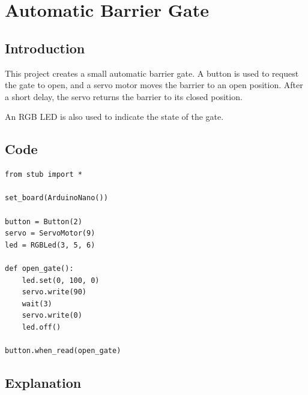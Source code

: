 \newpage

\section{Automatic Barrier Gate}

\subsection{Introduction}

This project creates a small automatic barrier gate. A button is used to
request the gate to open, and a servo motor moves the barrier to an open
position. After a short delay, the servo returns the barrier to its closed
position.

An RGB LED is also used to indicate the state of the gate.

\subsection{Code}

\begin{lstlisting}
from stub import *

set_board(ArduinoNano())

button = Button(2)
servo = ServoMotor(9)
led = RGBLed(3, 5, 6)

def open_gate():
    led.set(0, 100, 0)
    servo.write(90)
    wait(3)
    servo.write(0)
    led.off()

button.when_read(open_gate)
\end{lstlisting}

\subsection{Explanation}

